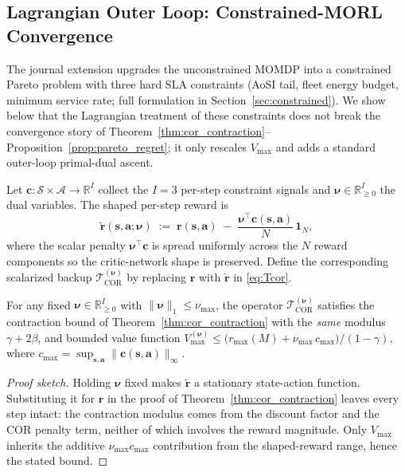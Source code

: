 \subsection{Lagrangian Outer Loop: Constrained-MORL Convergence}
\label{ssec:lagrangian_outer}

The journal extension upgrades the unconstrained MOMDP into a constrained
Pareto problem with three hard SLA constraints (AoSI tail, fleet energy
budget, minimum service rate; full formulation in
Section~\ref{sec:constrained}). We show below that the Lagrangian
treatment of these constraints does not break the convergence story of
Theorem~\ref{thm:cor_contraction}--Proposition~\ref{prop:pareto_regret};
it only rescales $V_{\max}$ and adds a standard outer-loop primal-dual
ascent.

Let $\mathbf{c}:\mathcal{S}\times\mathcal{A}\to\mathbb{R}^I$ collect the
$I=3$ per-step constraint signals and $\bm{\nu}\in\mathbb{R}_{\ge 0}^I$
the dual variables. The shaped per-step reward is
\begin{equation}
\label{eq:shaped_reward}
\tilde{\mathbf{r}}(\mathbf{s},\mathbf{a};\bm{\nu})
\;:=\;
\mathbf{r}(\mathbf{s},\mathbf{a})
\;-\;
\frac{\bm{\nu}^\top \mathbf{c}(\mathbf{s},\mathbf{a})}{N}\,\mathbf{1}_N,
\end{equation}
where the scalar penalty $\bm{\nu}^\top\mathbf{c}$ is spread uniformly
across the $N$ reward components so the critic-network shape is
preserved. Define the corresponding scalarized backup
$\mathcal{T}_{\text{COR}}^{(\bm{\nu})}$ by replacing $\mathbf{r}$ with
$\tilde{\mathbf{r}}$ in \eqref{eq:Tcor}.

\begin{proposition}
\label{prop:inner_contraction}
For any fixed $\bm{\nu}\in\mathbb{R}_{\ge 0}^I$ with
$\|\bm{\nu}\|_1\le\nu_{\max}$, the operator
$\mathcal{T}_{\text{COR}}^{(\bm{\nu})}$ satisfies the contraction bound
of Theorem~\ref{thm:cor_contraction} with the \emph{same} modulus
$\gamma+2\beta$, and bounded value function
$V_{\max}^{(\bm{\nu})} \le \bigl(r_{\max}(M)+\nu_{\max}\,c_{\max}\bigr)/(1-\gamma)$,
where $c_{\max}=\sup_{\mathbf{s},\mathbf{a}}\|\mathbf{c}(\mathbf{s},
\mathbf{a})\|_\infty$.
\end{proposition}

\begin{proof}[Proof sketch]
Holding $\bm{\nu}$ fixed makes $\tilde{\mathbf{r}}$ a stationary
state-action function. Substituting it for $\mathbf{r}$ in the proof of
Theorem~\ref{thm:cor_contraction} leaves every step intact: the
contraction modulus comes from the discount factor and the COR penalty
term, neither of which involves the reward magnitude. Only $V_{\max}$
inherits the additive $\nu_{\max}c_{\max}$ contribution from the
shaped-reward range, hence the stated bound.
\end{proof}


